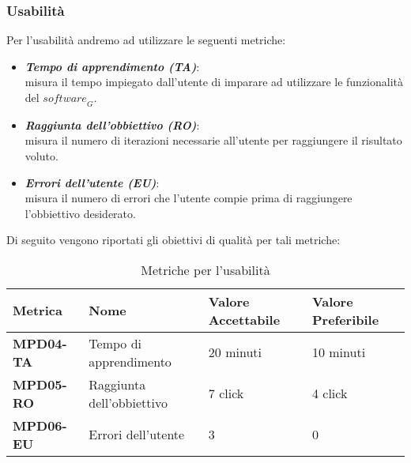\subsubsection{Usabilità}
Per l'usabilità andremo ad utilizzare le seguenti metriche:
\begin{itemize}
    \item \textbf{\emph{Tempo di apprendimento (TA)}}:\\
    misura il tempo impiegato dall'utente di imparare ad utilizzare le funzionalità del $\textit{software}_G$.
    \item \textbf{\emph{Raggiunta dell'obbiettivo (RO)}}:\\
    misura il numero di iterazioni necessarie all'utente per raggiungere il risultato voluto.
    \item \textbf{\emph{Errori dell'utente (EU)}}:\\
    misura il numero di errori che l'utente compie prima di raggiungere l'obbiettivo desiderato.
\end{itemize}
Di seguito vengono riportati gli obiettivi di qualità per tali metriche:
\begin{table}[htbp]
    \centering
    \begin{tabular}{|>{\centering\arraybackslash}p{4cm}|p{4cm}|p{4cm}|p{4cm}|}
    \hline
    \rowcolor{gray!30}
    \textbf{Metrica} & \textbf{Nome} & \textbf{Valore Accettabile} & \textbf{Valore Preferibile} \\
    \hline
    \rowcolor{gray!10}
    \textbf{MPD04-TA} & Tempo di apprendimento & 20 minuti & 10 minuti \\
    \hline
    \rowcolor{gray!10}
    \textbf{MPD05-RO} & Raggiunta dell'obbiettivo & 7 click & 4 click \\
    \hline
    \rowcolor{gray!10}
    \textbf{MPD06-EU} & Errori dell'utente & 3 & 0 \\
    \hline
    \end{tabular}
    \caption{Metriche per l'usabilità}
    \label{tab:metriche_usabilita}
\end{table}
\newpage
